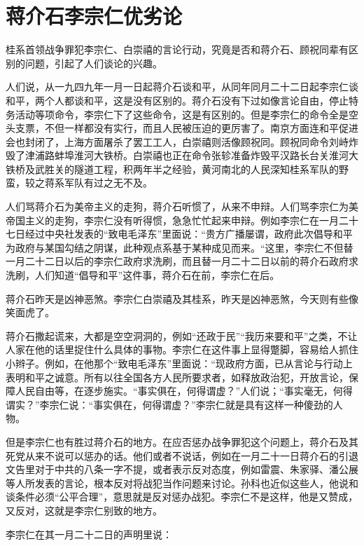 \section[蒋介石李宗仁优劣论（一九四九年二月二十一日）]{蒋介石李宗仁优劣论}


桂系首领战争罪犯李宗仁、白崇禧的言论行动，究竟是否和蒋介石、顾祝同辈有区别的问题，引起了人们谈论的兴趣。

人们说，从一九四九年一月一日起蒋介石谈和平，从同年同月二十二日起李宗仁谈和平，两个人都谈和平，这是没有区别的。蒋介石没有下过如像言论自由，停止特务活动等项命令，李宗仁下了这些命令，这是有区别的。但是李宗仁的命令全是空头支票，不但一样都没有实行，而且人民被压迫的更厉害了。南京方面连和平促进会也封闭了，上海方面屠杀了罢工工人，白崇禧则活像顾祝同。顾祝同命令刘峙炸毁了津浦路蚌埠淮河大铁桥。白崇禧也正在命令张轸准备炸毁平汉路长台关淮河大铁桥及武胜关的隧道工程，积两年半之经验，黄河南北的人民深知桂系军队的野蛮，较之蒋系军队有过之无不及。

人们骂蒋介石为美帝主义的走狗，蒋介石听惯了，从来不申辩。人们骂李宗仁为美帝国主义的走狗，李宗仁没有听得惯，急急忙忙起来申辩。例如李宗仁在一月二十七日经过中央社发表的“致电毛泽东”里面说：“贵方广播屡谓，政府此次倡导和平为政府与某国勾结之阴谋，此种观点系基于某种成见而来。“这里，李宗仁不但替一月二十二日以后的李宗仁政府求洗刷，而且替一月二十二日以前的蒋介石政府求洗刷，人们知道“倡导和平”这件事，蒋介石在前，李宗仁在后。

蒋介石昨天是凶神恶煞。李宗仁白崇禧及其桂系，昨天是凶神恶煞，今天则有些像笑面虎了。

蒋介石撒起谎来，大都是空空洞洞的，例如“还政于民”“我历来要和平”之类，不让人家在他的话里捉住什么具体的事物。李宗仁在这件事上显得蹩脚，容易给人抓住小辫子。例如，在他那个“致电毛泽东”里面说：“现政府方面，已从言论与行动上表明和平之诚意。所有以往全国各方人民所要求者，如释放政治犯，开放言论，保障人民自由等，在逐步施实。“事实俱在，何得谓虚？”人们说；“事实毫无，何得谓实？”李宗仁说：“事实俱在，何得谓虚？”李宗仁就是具有这样一种傻劲的人物。

但是李宗仁也有胜过蒋介石的地方。在应否惩办战争罪犯这个问题上，蒋介石及其死党从来不说可以惩办的话。他们或者不说话，例如在一月二十一日蒋介石的引退文告里对于中共的八条一字不提，或者表示反对态度，例如雷震、朱家驿、潘公展等人所发表的言论，根本反对将战犯当作问题来讨论。孙科也近似这些人，他说和谈条件必须“公平合理”，意思就是反对惩办战犯。李宗仁不是这样，他是又赞成，又反对，这就是李宗仁别致的地方。

李宗仁在其一月二十二日的声明里说：

